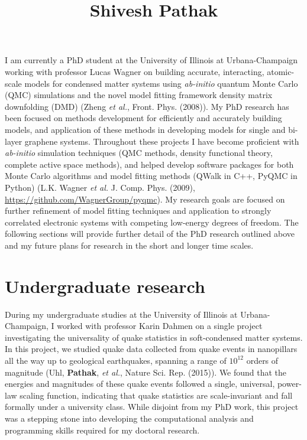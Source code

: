 \documentclass{article}
\title{Shivesh Pathak}
\date{\vspace{-10ex}}
\begin{document}
\maketitle

I am currently a PhD student at the University of Illinois at Urbana-Champaign working with professor Lucas Wagner on building accurate, interacting, atomic-scale models for condensed matter systems using \textit{ab-initio} quantum Monte Carlo (QMC) simulations and the novel model fitting framework density matrix downfolding (DMD) (Zheng \textit{et al.}, Front. Phys.  (2008)).
My PhD research has been focused on methods development for efficiently and accurately building models, and application of these methods in developing models for single and bi-layer graphene systems.
Throughout these projects I have become proficient with \textit{ab-initio} simulation techniques (QMC methods, density functional theory, complete active space methods), and helped develop software packages for both Monte Carlo algorithms and model fitting methods (QWalk in C++, PyQMC in Python) (L.K. Wagner \textit{et al.} J.  Comp.  Phys. (2009), \url{https://github.com/WagnerGroup/pyqmc}).
My research goals are focused on further refinement  of model fitting techniques and application to strongly correlated electronic systems with competing low-energy degrees of freedom.
The following sections will provide further detail of the PhD research outlined above and my future plans for research in the short and longer time scales.

\section{Undergraduate research}
During my undergraduate studies at the University of Illinois at Urbana-Champaign, I worked with professor Karin Dahmen on a single project investigating the universality of quake statistics in soft-condensed matter systems.
In this project,  we studied quake data collected from quake events in nanopillars all the way up to geological earthquakes, spanning a range of $10^{12}$ orders of magnitude (Uhl, \textbf{Pathak}, \textit{et al.}, Nature Sci. Rep. (2015)).
We found that the energies and magnitudes of these quake events followed a single, universal, power-law scaling function, indicating that quake statistics are scale-invariant and fall formally under a university class.
While disjoint from my PhD work, this project was a stepping stone into developing the computational analysis and programming skills required for my doctoral research.
\end{document}
